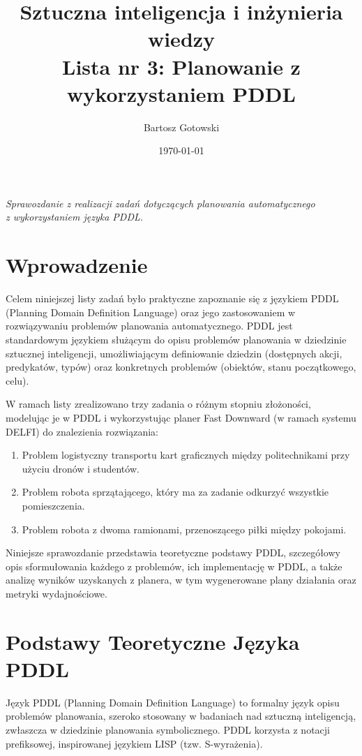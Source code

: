 \documentclass[12pt,a4paper]{article}
\title{\LARGE \textbf{Sztuczna inteligencja i inżynieria wiedzy}\\
\large Lista nr 3: Planowanie z wykorzystaniem PDDL}
\author{Bartosz Gotowski}
\date{\today}
\begin{document}
\maketitle
\begin{center}
    \textit{Sprawozdanie z realizacji zadań dotyczących planowania automatycznego \\ z wykorzystaniem języka PDDL.}
\end{center}
\vspace{1cm}

\tableofcontents
\clearpage

\section{Wprowadzenie}
Celem niniejszej listy zadań było praktyczne zapoznanie się z językiem PDDL (Planning Domain Definition Language) oraz jego zastosowaniem w rozwiązywaniu problemów planowania automatycznego. PDDL jest standardowym językiem służącym do opisu problemów planowania w dziedzinie sztucznej inteligencji, umożliwiającym definiowanie dziedzin (dostępnych akcji, predykatów, typów) oraz konkretnych problemów (obiektów, stanu początkowego, celu).

W ramach listy zrealizowano trzy zadania o różnym stopniu złożoności, modelując je w PDDL i wykorzystując planer Fast Downward (w ramach systemu DELFI) do znalezienia rozwiązania:
\begin{enumerate}
    \item Problem logistyczny transportu kart graficznych między politechnikami przy użyciu dronów i studentów.
    \item Problem robota sprzątającego, który ma za zadanie odkurzyć wszystkie pomieszczenia.
    \item Problem robota z dwoma ramionami, przenoszącego piłki między pokojami.
\end{enumerate}
Niniejsze sprawozdanie przedstawia teoretyczne podstawy PDDL, szczegółowy opis sformułowania każdego z problemów, ich implementację w PDDL, a także analizę wyników uzyskanych z planera, w tym wygenerowane plany działania oraz metryki wydajnościowe.

\section{Podstawy Teoretyczne Języka PDDL}
Język PDDL (Planning Domain Definition Language) to formalny język opisu problemów planowania, szeroko stosowany w badaniach nad sztuczną inteligencją, zwłaszcza w dziedzinie planowania symbolicznego. PDDL korzysta z notacji prefiksowej, inspirowanej językiem LISP (tzw. S-wyrażenia).
\end{document}
